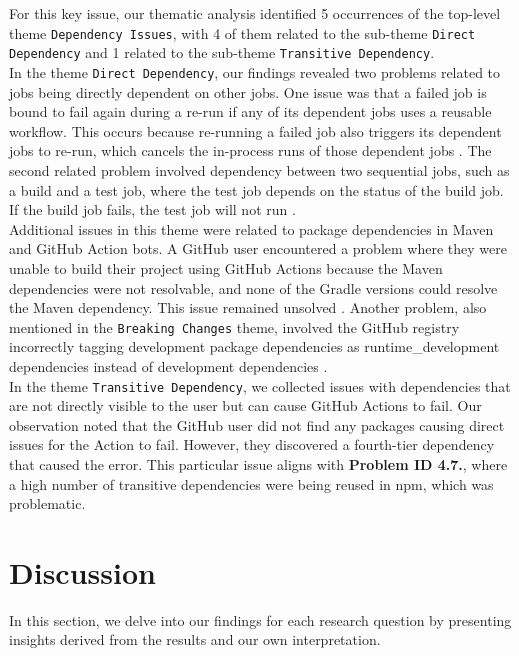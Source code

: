 \documentclass[conference]{IEEEtran}
\begin{document}
	For this key issue, our thematic analysis identified 5 occurrences of the top-level theme \texttt{Dependency Issues}, with 4 of them related to the sub-theme \texttt{Direct Dependency} and 1 related to the sub-theme \texttt{Transitive Dependency}.\\
	In the theme \texttt{Direct Dependency}, our findings revealed two problems related to jobs being directly dependent on other jobs. One issue was that a failed job is bound to fail again during a re-run if any of its dependent jobs uses a reusable workflow. This occurs because re-running a failed job also triggers its dependent jobs to re-run, which cancels the in-process runs of those dependent jobs \cite{gvanrossum2024}. The second related problem involved dependency between two sequential jobs, such as a build and a test job, where the test job depends on the status of the build job. If the build job fails, the test job will not run \cite{hugomg2024}.\\
	Additional issues in this theme were related to package dependencies in Maven and GitHub Action bots. A GitHub user encountered a problem where they were unable to build their project using GitHub Actions because the Maven dependencies were not resolvable, and none of the Gradle versions could resolve the Maven dependency. This issue remained unsolved \cite{kxuenvoy2024}. Another problem, also mentioned in the \texttt{Breaking Changes} theme, involved the GitHub registry incorrectly tagging development package dependencies as runtime\_development dependencies instead of development dependencies \cite{nbibler2024}.\\
	In the theme \texttt{Transitive Dependency}, we collected issues with dependencies that are not directly visible to the user but can cause GitHub Actions to fail. Our observation noted that the GitHub user did not find any packages causing direct issues for the Action to fail. However, they discovered a fourth-tier dependency that caused the error. This particular issue aligns with \textbf{Problem ID 4.7.}, where a high number of transitive dependencies were being reused in npm, which was problematic\cite{hugomg22024}.
    \section{Discussion}
    In this section, we delve into our findings for each research question by presenting insights derived from the results and our own interpretation.\\
    
\end{document}
